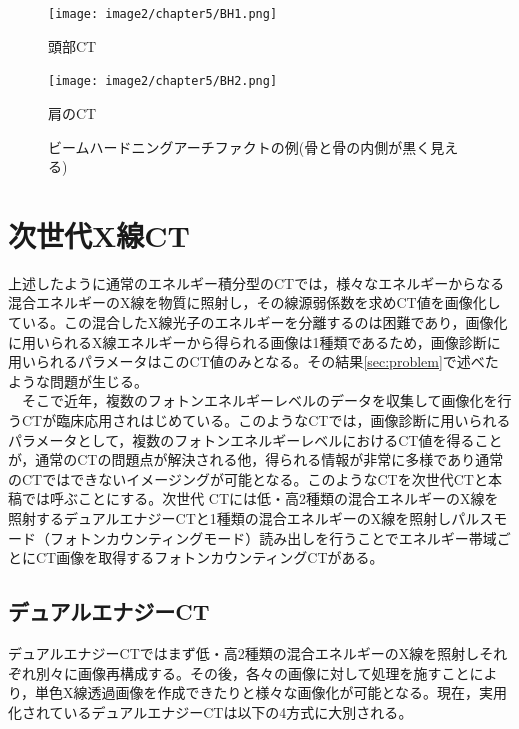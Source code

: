 \begin{figure}[H]
 \begin{minipage}{0.5\hsize}
  \begin{center}
   \texttt{[image: image2/chapter5/BH1.png]} 
  \end{center}
  \vspace{0cm}
  \caption*{頭部CT}
 \end{minipage}
 \begin{minipage}{0.5\hsize}
  \begin{center}
 \texttt{[image: image2/chapter5/BH2.png]} 
  \end{center}
  \vspace{0cm}
  \caption*{肩のCT}
 \end{minipage}
 \begin{center}
  \caption{ビームハードニングアーチファクトの例(骨と骨の内側が黒く見える)}
  \label{fig:BH_artifact}
  \end{center}
\end{figure}






\section{次世代X線CT}
上述したように通常のエネルギー積分型のCTでは，様々なエネルギーからなる混合エネルギーのX線を物質に照射し，その線源弱係数を求めCT値を画像化している。この混合したX線光子のエネルギーを分離するのは困難であり，画像化に用いられるX線エネルギーから得られる画像は1種類であるため，画像診断に用いられるパラメータはこのCT値のみとなる。その結果\ref{sec:problem}で述べたような問題が生じる。\\
\ \ そこで近年，複数のフォトンエネルギーレベルのデータを収集して画像化を行うCTが臨床応用されはじめている。このようなCTでは，画像診断に用いられるパラメータとして，複数のフォトンエネルギーレベルにおけるCT値を得ることが，通常のCTの問題点が解決される他，得られる情報が非常に多様であり通常のCTではできないイメージングが可能となる。このようなCTを次世代CTと本稿では呼ぶことにする。次世代
CTには低・高2種類の混合エネルギーのX線を照射するデュアルエナジーCTと1種類の混合エネルギーのX線を照射しパルスモード（フォトンカウンティングモード）読み出しを行うことでエネルギー帯域ごとにCT画像を取得するフォトンカウンティングCTがある。

\subsection{デュアルエナジーCT\label{sec:dual}}
デュアルエナジーCTではまず低・高2種類の混合エネルギーのX線を照射しそれぞれ別々に画像再構成する。その後，各々の画像に対して処理を施すことにより，単色X線透過画像を作成できたりと様々な画像化が可能となる。現在，実用化されているデュアルエナジーCTは以下の4方式に大別される\cite{GE}\cite{siemens}\cite{philips}。


